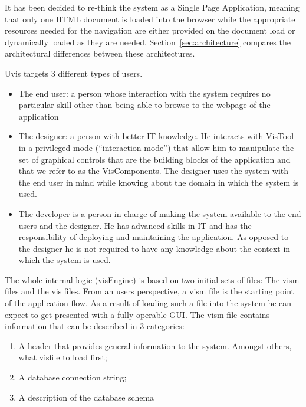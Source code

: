 It has been decided to re-think the system as a Single Page Application, meaning that only one HTML document is loaded into the browser while the appropriate resources needed for the navigation are either provided on the document load or dynamically loaded as they are needed. Section~\ref{sec:architecture} compares the architectural differences between these architectures.

Uvis targets 3 different types of users.

\begin{itemize}
    \item The end user: a person whose interaction with the system requires no particular skill other than being able to browse to the webpage of the application
    
    \item The designer: a person with better IT knowledge. He interacts with VisTool in a privileged mode (``interaction mode'') that allow him to manipulate the set of graphical controls that are the building blocks of the application and that we refer to as the VisComponents. The designer uses the system with the end user in mind while knowing about the domain in which the system is used. 

    \item The developer is a person in charge of making the system available to the end users and the designer. He has advanced skills in IT and has the responsibility of deploying and maintaining the application. As opposed to the designer he is not required to have any knowledge about the context in which the system is used.

\end{itemize}

The whole internal logic (visEngine) is based on two initial sets of files: The vism files and the vis files.
From an users perspective, a vism file is the starting point of the application flow. As a result of loading such a file into the system he can expect to get presented with a fully operable GUI. The vism file contains information that can be described in 3 categories:

\begin{enumerate}
    \item A header that provides general information to the system. Amongst others, what visfile to load first;
    \item A database connection string;
    \item A description of the database schema
\end{enumerate}

